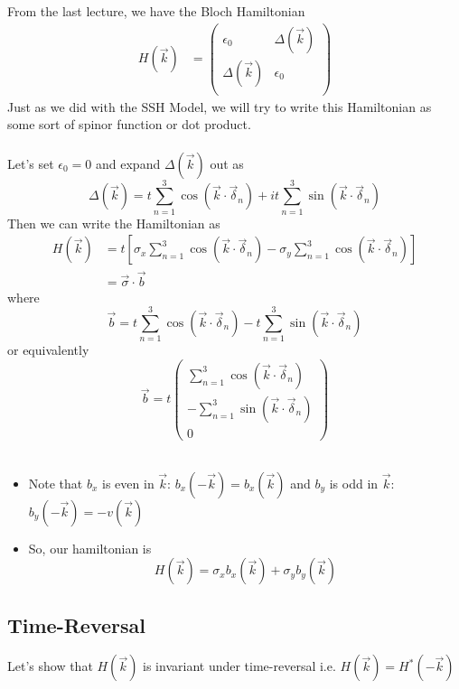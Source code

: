 \documentclass[11pt]{article}
\begin{document}
From the last lecture, we have the Bloch Hamiltonian 
\begin{align*}
  H(\vec{k}) &= \begin{pmatrix}
    \epsilon_0 & \Delta(\vec{k}) \\
    \Delta(\vec{k}) & \epsilon_0\\
  \end{pmatrix}
\end{align*} Just as we did with the SSH Model, we will try to write this Hamiltonian as some sort of spinor function or dot product.
\\
\\
Let's set $\epsilon_0 = 0$ and expand $\Delta(\vec{k})$ out as $$ \Delta(\vec{k}) = t\sum_{n=1}^3 \cos\left(\vec{k} \cdot \vec{\delta}_n\right) + it\sum_{n=1}^3 \sin\left(\vec{k} \cdot \vec{\delta}_n\right) $$ Then we can write the Hamiltonian as 
\begin{align*}
  H(\vec{k}) &= t\left[ \sigma_x \sum_{n=1}^3 \cos\left(\vec{k} \cdot \vec{\delta}_n\right) - \sigma_y\sum_{n=1}^3 \cos\left(\vec{k} \cdot \vec{\delta}_n\right) \right] \\
  &= \vec{\sigma} \cdot \vec{b}
\end{align*} where $$ \vec{b} = t\sum_{n=1}^3 \cos\left(\vec{k} \cdot \vec{\delta}_n\right) - t\sum_{n=1}^3 \sin\left(\vec{k} \cdot \vec{\delta}_n\right) $$ or equivalently $$ \vec{b} = t \begin{pmatrix}
  \sum_{n=1}^3 \cos\left(\vec{k} \cdot \vec{\delta}_n\right) \\
  -\sum_{n=1}^3 \sin\left(\vec{k} \cdot \vec{\delta}_n\right) \\
  0
\end{pmatrix} $$ 
\\
\begin{itemize}
  \item Note that $b_x$ is even in $\vec{k}$: $b_x(-\vec{k}) = b_x (\vec{k})$ and $b_y$ is odd in $\vec{k}$: $b_y(-\vec{k}) = -v(\vec{k})$
  \item So, our hamiltonian is $$ \boxed{H(\vec{k}) = \sigma_x b_x(\vec{k}) + \sigma_y b_y(\vec{k}) } $$
\end{itemize} 

\vskip 1cm
\subsection{Time-Reversal}
Let's show that $H(\vec{k})$ is invariant under time-reversal i.e. $ H(\vec{k}) = H^*(-\vec{k}) $
\end{document}
